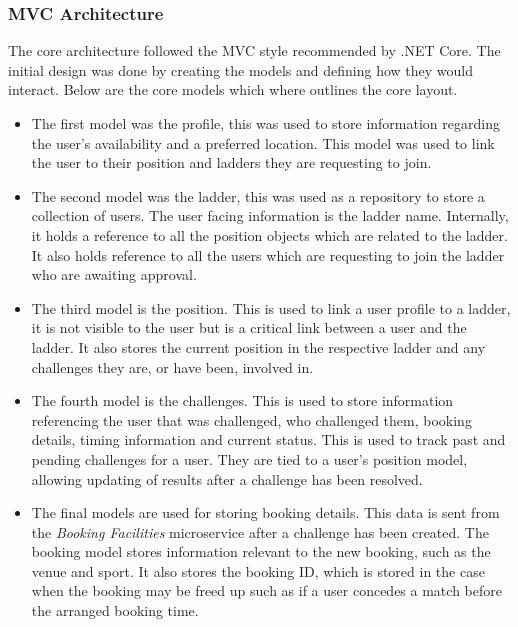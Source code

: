 \subsubsection{MVC Architecture}
\par
The core architecture followed the MVC style recommended by .NET Core. The initial design was done by creating the models and defining how they would interact. Below are the core models which where outlines the core layout.

\begin{itemize}

	\item The first model was the profile, this was used to store information regarding the user's availability and a preferred location. This model was used to link the user to their position and ladders they are requesting to join.

	\item The second model was the ladder, this was used as a repository to store a collection of users. The user facing information is the ladder name. Internally, it holds a reference to all the position objects which are related to the ladder. It also holds reference to all the users which are requesting to join the ladder who are awaiting approval.

	\item The third model is the position. This is used to link a user profile to a ladder, it is not visible to the user but is a critical link between a user and the ladder. It also stores the current position in the respective ladder and any challenges they are, or have been, involved in.

	\item The fourth model is the challenges. This is used to store information referencing the user that was challenged, who challenged them, booking details, timing information and current status. This is used to track past and pending challenges for a user. They are tied to a user’s position model, allowing updating of results after a challenge has been resolved.

	\item The final models are used for storing booking details. This data is sent from the \textit{Booking Facilities} microservice after a challenge has been created. The booking model stores information relevant to the new booking, such as the venue and sport. It also stores the booking ID, which is stored in the case when the booking may be freed up such as if a user concedes a match before the arranged booking time.

\end{itemize}


